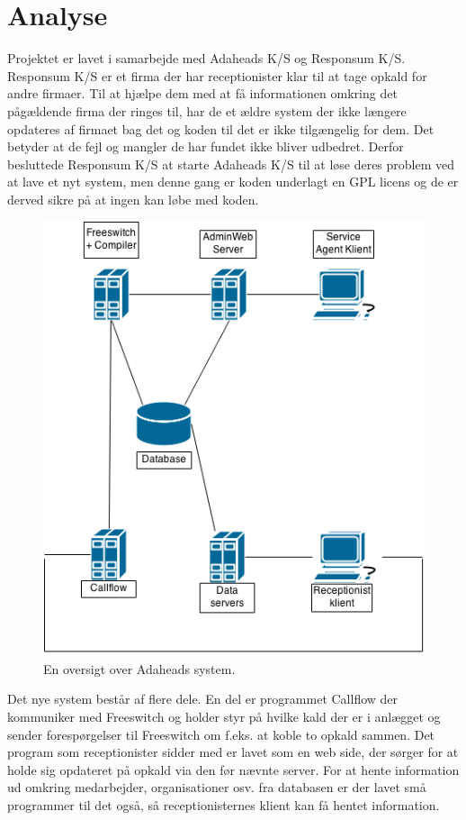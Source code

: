 \chapter{Analyse}

Projektet er lavet i samarbejde med Adaheads K/S og Responsum K/S. \linebreak
Responsum K/S er et firma der har receptionister klar til at tage opkald for andre firmaer. Til at hjælpe dem med at få informationen omkring det pågældende firma der ringes til, har de et ældre system der ikke længere opdateres af firmaet bag det og koden til det er ikke tilgængelig for dem. Det betyder at de fejl og mangler de har fundet ikke bliver udbedret. Derfor besluttede Responsum K/S at starte Adaheads K/S til at løse deres problem ved at lave et nyt system, men denne gang er koden underlagt en GPL licens og de er derved sikre på at ingen kan løbe med koden.

\begin{figure}[ht!]
\centering
\includegraphics[scale=0.5]{images/adaheads_system.png}
\caption{En oversigt over Adaheads system.}
\label{fig:adaheadssystem}
\end{figure}
Det nye system består af flere dele. En del er programmet Callflow der kommuniker med Freeswitch og holder styr på hvilke kald der er i anlægget og sender forespørgelser til Freeswitch om f.eks. at koble to opkald sammen. Det program som receptionister sidder med er lavet som en web side, der sørger for at holde sig opdateret på opkald via den før nævnte server. For at hente information ud omkring medarbejder, organisationer osv. fra databasen er der lavet små programmer til det også, så receptionisternes klient kan få hentet information.

